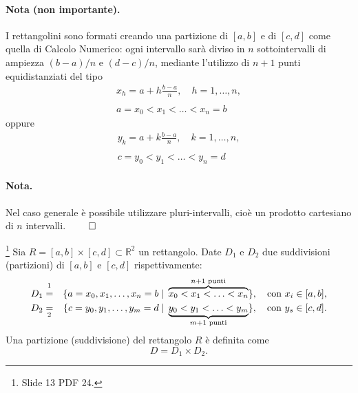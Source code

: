 \paragraph{Nota (non importante).} I rettangolini sono formati creando una partizione di $[a,b]$ e di $[c,d]$ come quella di Calcolo Numerico: ogni intervallo sarà diviso in $n$ sottointervalli di ampiezza $(b-a)/n$ e $(d-c)/n$, mediante l'utilizzo di $n+1$ punti equidistanziati del tipo
\begin{equation*}
	\begin{matrix}
		x_h = a + h \frac{b-a}{n},\quad h=1, \hdots, n,\\\\
		a=x_0<x_1<\hdots<x_n=b
	\end{matrix}
\end{equation*}
oppure 
\begin{equation*}
	\begin{matrix}
		y_k = a + k \frac{b-a}{n},\quad k=1, \hdots, n,\\\\
		c=y_0<y_1<\hdots<y_n=d
	\end{matrix}
\end{equation*}

\paragraph{Nota.} Nel caso generale è possibile utilizzare pluri-intervalli, cioè un prodotto cartesiano di $n$ intervalli. $\qed$

\begin{definition}
	\footnote{Slide 13 PDF 24.} Sia $R = [a,b]\times [c,d]\subset\mathbb{R}^2$ un rettangolo. Date $D_1$ e $D_2$ due suddivisioni (partizioni) di $[a,b]$ e $[c,d]$ rispettivamente:
	\begin{equation*}
		\begin{aligned}
			D_1 &\overset{\footnotemark}{=}& \{a = x_0, x_1,\hdots, x_n = b\;|\; \overbrace{x_0<x_1<\hdots <x_n}^{n+1\text{ punti}}\},\quad\text{con } x_i\in[a,b],\\
			D_2 &\underset{\footnotemark}{=}& \{c=y_0, y_1,\hdots, y_m =d\; | \; \underbrace{y_0<y_1<\hdots<y_m}_{m+1\text{ punti}}\},\quad\text{con } y_s\in[c,d].
		\end{aligned}
	\end{equation*}
	Una partizione (suddivisione) del rettangolo $R$ è definita come
	\begin{equation}\label{eq:suddivisione_rettangolo}
		D=D_1\times D_2.
	\end{equation}
\end{definition}
\addtocounter{footnote}{-1}

